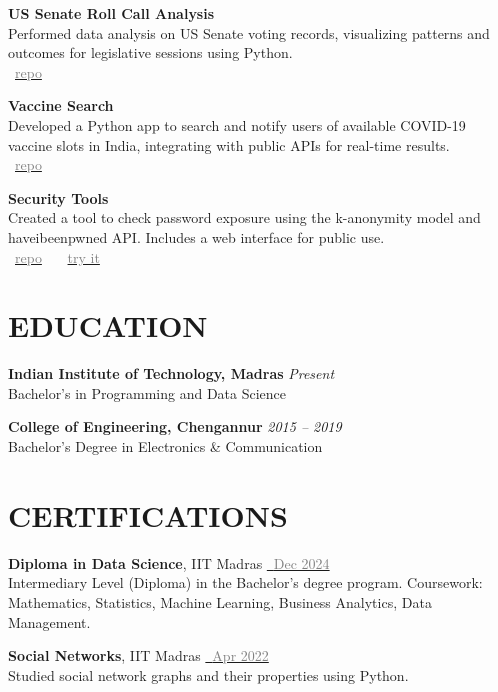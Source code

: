 \documentclass[11pt,a4paper]{article}
\begin{document}
\textbf{US Senate Roll Call Analysis} \\
Performed data analysis on US Senate voting records, visualizing patterns and outcomes for legislative sessions using Python. \\
\faGithub~\href{https://github.com/jishnujp/US_senate_roll_call}{\textcolor{gray}{repo}} 

\textbf{Vaccine Search} \\
Developed a Python app to search and notify users of available COVID-19 vaccine slots in India, integrating with public APIs for real-time results. \\
\faGithub~\href{https://github.com/jishnujp/vaccine_search}{\textcolor{gray}{repo}} 

\textbf{Security Tools} \\
Created a tool to check password exposure using the k-anonymity model and haveibeenpwned API. Includes a web interface for public use. \\
\faGithub~\href{https://github.com/jishnujp/securityTools}{\textcolor{gray}{repo}} \, \textbar{} \,
\faGlobe~\href{https://jishnujp.github.io/securityTools}{\textcolor{gray}{try it}} 

\section*{EDUCATION}
\textbf{Indian Institute of Technology, Madras} \hfill \textit{Present} \\
Bachelor's in Programming and Data Science

\textbf{College of Engineering, Chengannur} \hfill \textit{2015 -- 2019} \\
Bachelor's Degree in Electronics \& Communication

\section*{CERTIFICATIONS}
\textbf{Diploma in Data Science}, IIT Madras \hfill 
\href{https://jishnujp.github.io/certificates/data_science_diploma.pdf}{\faFilePdfO~\textcolor{gray}{Dec 2024}} \\
Intermediary Level (Diploma) in the Bachelor's degree program. Coursework: Mathematics, Statistics, Machine Learning, Business Analytics, Data Management. 

\textbf{Social Networks}, IIT Madras \hfill
\href{https://archive.nptel.ac.in/content/noc/NOC22/SEM1/Ecertificates/106/noc22-cs30/Course/NPTEL22CS30S4373058402018648.jpg}{\faFilePdfO~\textcolor{gray}{Apr 2022}} \\
Studied social network graphs and their properties using Python. 
\end{document}
